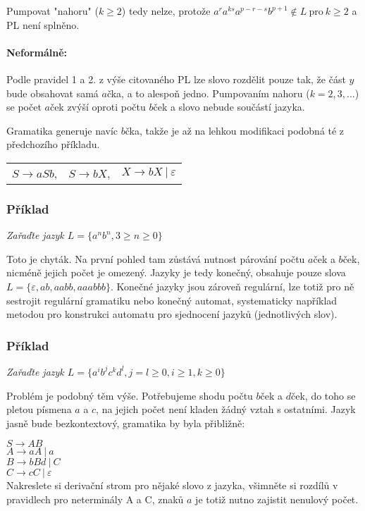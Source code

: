 \documentclass{article}
\begin{document}
Pumpovat "nahoru" ($k\geq 2$) tedy nelze, protože $a^ra^{ks}a^{p-r-s}b^{p+1} \notin L \ \text{pro}\ k\geq2$ a PL není splněno.

\paragraph{Neformálně:}
Podle pravidel 1 a 2. z výše citovaného PL lze slovo rozdělit pouze tak, že část $y$ bude obsahovat samá $a$čka, a to alespoň jedno.
Pumpovaním nahoru ($k = 2, 3, ...$) se počet $a$ček zvýší oproti počtu $b$ček a slovo nebude součástí jazyka.

Gramatika generuje navíc $b$čka, takže je až na lehkou modifikaci podobná té z předchozího příkladu.
\begin{tabular}{ccc}
$S \rightarrow aSb$,   &  $S \rightarrow bX$,   &  $X \rightarrow bX ~|~ \varepsilon$
\end{tabular}


\subsubsection{Příklad}
\emph{Zařaďte jazyk $L = \{a^nb^n, 3 \geq n \geq 0\}$}

Toto je chyták.
Na první pohled tam zůstává nutnost párování počtu $a$ček a $b$ček, nicméně jejich počet je omezený.
Jazyky je tedy konečný, obsahuje pouze slova $L = \{\varepsilon, ab, aabb, aaabbb\}$. Konečné jazyky jsou zároveň regulární, lze totiž pro ně sestrojit regulární gramatiku nebo konečný automat, systematicky například metodou pro konstrukci automatu pro sjednocení jazyků (jednotlivých slov).

\subsubsection{Příklad}
\emph{Zařaďte jazyk $L = \{a^ib^jc^kd^l, j=l\geq0, i \geq 1, k \geq 0 \}$}

Problém je podobný těm výše.
Potřebujeme shodu počtu $b$ček a $d$ček, do toho se pletou písmena $a$ a $c$, na jejich počet není kladen žádný vztah s ostatními.
Jazyk jasně bude bezkontextový, gramatika by byla přibližně:

$S \rightarrow A B$\\
$A \rightarrow aA ~|~ a$\\
$B \rightarrow bBd ~|~ C$\\
$C \rightarrow cC ~|~ \varepsilon$\\

Nakreslete si derivační strom pro nějaké slovo z jazyka, všimněte si rozdílů v pravidlech pro neterminály A a C, znaků $a$ je totiž nutno zajistit nenulový počet.
\end{document}
